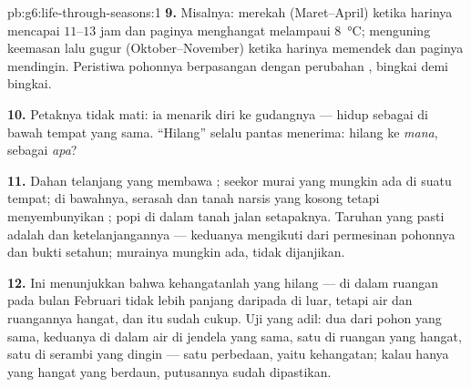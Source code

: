\begin{solution}{pb:g6:life-through-seasons:1}
\textbf{9.} Misalnya:  merekah (Maret--April) ketika harinya
mencapai $11$--$13$ jam dan paginya menghangat melampaui
\qty{8}{\degreeCelsius};  menguning keemasan lalu gugur
(Oktober--November) ketika harinya memendek dan paginya mendingin.
Peristiwa pohonnya berpasangan dengan perubahan , bingkai
demi bingkai.

\textbf{10.} Petaknya tidak mati: ia menarik diri ke gudangnya ---
hidup sebagai  di bawah tempat yang sama. ``Hilang'' selalu
pantas menerima: hilang ke \emph{mana}, sebagai \emph{apa}?

\textbf{11.} Dahan telanjang yang membawa ; seekor  murai
yang mungkin ada di suatu tempat; di bawahnya, serasah dan tanah 
narsis yang kosong tetapi menyembunyikan ;   popi
di dalam tanah jalan setapaknya. Taruhan yang pasti adalah  dan
ketelanjangannya --- keduanya mengikuti dari permesinan 
pohonnya dan bukti setahun;  murainya mungkin ada, tidak
dijanjikan.

\textbf{12.} Ini menunjukkan bahwa kehangatanlah  yang hilang
---  di dalam ruangan pada bulan Februari tidak lebih panjang
daripada di luar, tetapi air dan ruangannya hangat, dan itu sudah
cukup. Uji yang adil: dua  dari pohon yang sama, keduanya di
dalam air di jendela yang sama, satu di ruangan yang hangat, satu di
serambi yang dingin --- satu perbedaan, yaitu kehangatan; kalau hanya
 yang hangat yang berdaun, putusannya sudah dipastikan.
\end{solution}
